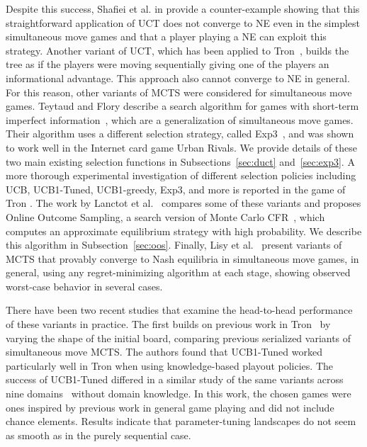 Despite this success, Shafiei et al. in \cite{Shafiei09} provide a counter-example showing that this straightforward application of UCT does not
converge to NE even in the simplest simultaneous move games and that a player playing a NE can exploit this strategy. Another variant of UCT, which has been applied to  Tron~\cite{Samothrakis10Tron}, builds the tree as if the players were moving sequentially giving one of the players an informational advantage. This approach also cannot converge to NE in general. For this reason, other variants of MCTS were considered for simultaneous move games. Teytaud and Flory describe a search algorithm for games with short-term imperfect information~\cite{Teytaud11Upper}, which are a generalization of simultaneous move games. Their algorithm uses a different selection strategy, called Exp3~\cite{Auer2003Exp3},
and was shown to work well in the Internet card game Urban Rivals. We provide details of these two main existing selection functions in Subsections~\ref{sec:duct} and~\ref{sec:exp3}.
A more thorough experimental investigation of different selection policies including UCB, UCB1-Tuned, UCB1-greedy, Exp3, and more is reported in the game of Tron \cite{Perick12Comparison}. The work by Lanctot et al.~\cite{Lanctot13Goofspiel} compares some of these variants and proposes Online Outcome Sampling, a search version of Monte Carlo CFR~\cite{Lanctot09Sampling}, which computes an approximate equilibrium strategy with high probability. We describe this algorithm in Subsection~\ref{sec:oos}.
Finally, Lisy et al.~\cite{lisy2013-nips} present variants of MCTS that provably converge to Nash equilibria in simultaneous move games, in general, using any regret-minimizing algorithm at each stage, showing observed worst-case behavior in several cases. 

There have been two recent studies that examine the head-to-head performance of these variants in practice. 
The first builds on previous work in Tron~\cite{Lanctot13Tron} by varying the shape of the initial board, 
comparing previous serialized variants of simultaneous move MCTS. The authors found that UCB1-Tuned worked 
particularly well in Tron when using knowledge-based playout policies. The success of UCB1-Tuned differed in 
a similar study of the same variants across nine domains~\cite{Tak14smmcts} without domain knowledge. In this 
work, the chosen games were ones inspired by previous work in general game playing and did not include chance elements. 
Results indicate that parameter-tuning landscapes do not seem as smooth as in the purely sequential case. 

